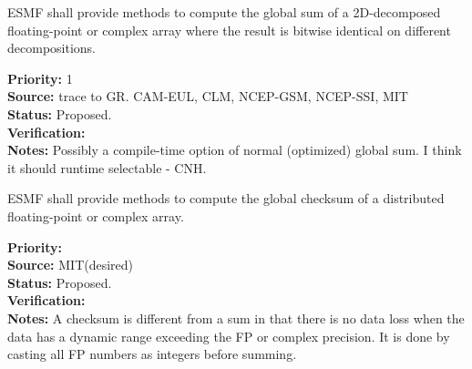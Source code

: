 
ESMF shall provide methods to compute the global sum of a
2D-decomposed floating-point or complex array where the result is
bitwise identical on different decompositions.

\begin{reqlist}
{\bf Priority:} 1 \\ 
{\bf Source:} trace to GR. CAM-EUL, CLM, NCEP-GSM, NCEP-SSI, MIT \\
{\bf Status:} Proposed. \\
{\bf Verification:} \\
{\bf Notes:} Possibly a compile-time option of normal (optimized)
             global sum. I think it should runtime selectable - CNH.
\end{reqlist}


ESMF shall provide methods to compute the global checksum of a
distributed floating-point or complex array. 

\begin{reqlist}
{\bf Priority:} \\
{\bf Source:} MIT(desired) \\
{\bf Status:} Proposed. \\
{\bf Verification:} \\
{\bf Notes:} A checksum is different from a sum in that there is no
  data loss when the data has a dynamic range exceeding the FP or
  complex precision. It is done by casting all FP numbers as integers
  before summing.
\end{reqlist}


%
%




